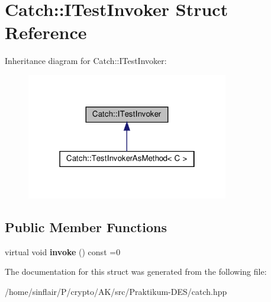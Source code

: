 \hypertarget{structCatch_1_1ITestInvoker}{}\section{Catch\+:\+:I\+Test\+Invoker Struct Reference}
\label{structCatch_1_1ITestInvoker}


Inheritance diagram for Catch\+:\+:I\+Test\+Invoker\+:
\nopagebreak
\begin{figure}[H]
\begin{center}
\leavevmode
\includegraphics[width=250pt]{structCatch_1_1ITestInvoker__inherit__graph}
\end{center}
\end{figure}
\subsection*{Public Member Functions}
\begin{DoxyCompactItemize}
\item 
\mbox{\label{structCatch_1_1ITestInvoker_a6fcd5c5b67d6d5ade6491ff33411ca7f}} 
virtual void {\bfseries invoke} () const =0
\end{DoxyCompactItemize}


The documentation for this struct was generated from the following file\+:\begin{DoxyCompactItemize}
\item 
/home/sinflair/\+P/crypto/\+A\+K/src/\+Praktikum-\/\+D\+E\+S/catch.\+hpp\end{DoxyCompactItemize}
